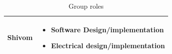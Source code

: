 \documentclass[a4]{article}
\begin{document}
\begin{table}[h!]
\begin{tabularx}{\linewidth}{|Y|Y|}
		Shivom                                             &
		\begin{minipage}[c]{\linewidth} %
			\vspace{2mm}
			\begin{itemize}[leftmargin=*, labelsep=3pt]
				\item Software Design/implementation
				\item Electrical design/implementation
			\end{itemize}
			\vspace{2mm}
		\end{minipage} \\
		\hline
	\end{tabularx}
	\caption{Group roles}
\end{table}

\clearpage
\end{document}
